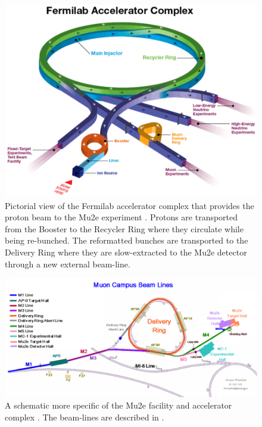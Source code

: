 \documentclass[12pt,a4paper,openright, oneside, titlepage]{book} %
\begin{document}
\begin{figure}[h!]
\centering
\includegraphics[scale=0.5]{ProtonBeamlineArial_3D}
\caption{Pictorial view of the Fermilab accelerator complex that provides the proton beam to the Mu2e experiment \cite{FNAL}. 
Protons are transported from the Booster to the Recycler Ring where they circulate while being re-bunched. 
The reformatted bunches are transported to the Delivery Ring where they are slow-extracted to the Mu2e detector through a new external beam-line.}
\label{_ProtonBeamlineArial}
\end{figure}

\begin{figure}[h!]
\centering
\includegraphics[scale=0.7]{ProtonBeamlineArial_sketch}
\caption{A schematic more specific of the Mu2e facility and accelerator complex \cite{MTDR}. 
The beam-lines are described in \cite{MTDR}.}
\label{_ProtonBeamlineArial_sketch}
\end{figure}
\end{document}
